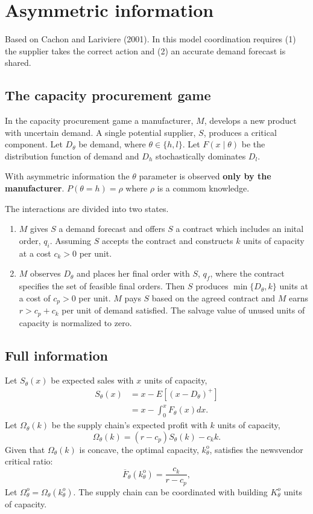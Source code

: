 \newpage
\section{Asymmetric information}
Based on Cachon and Lariviere (2001). In this model coordination requires (1) the supplier takes the correct action and (2) an accurate demand forecast is shared.

\subsection{The capacity procurement game}
In the capacity procurement game a manufacturer, $M$, develops a new product with uncertain demand. A single potential supplier, $S$, produces a critical component. Let $D_\theta$ be demand, where $\theta\in\{h,l\}$. Let $F(x\mid\theta)$ be the distribution function of demand and $D_h$ stochastically dominates $D_l$. 

With asymmetric information the $\theta$ parameter is observed \textbf{only by the manufacturer}. $P(\theta=h)=\rho$ where $\rho$ is a commom knowledge.

The interactions are divided into two states. 
\begin{enumerate}
    \item $M$ gives $S$ a demand forecast and offers $S$ a contract which includes an inital order, $q_i$. Assuming $S$ accepts the contract and constructs $k$ units of capacity at a cost $c_k>0$ per unit. 
    \item $M$ observes $D_\theta$ and places her final order with $S$, $q_f$, where the contract specifies the set of feasible final orders. Then $S$ produces $\min\{D_\theta,k\}$ units at a cost of $c_p>0$ per unit. $M$ pays $S$ based on the agreed contract and $M$ earns $r>c_p+c_k$ per unit of demand satisfied. The salvage value of unused units of capacity is normalized to zero. 
\end{enumerate}

\subsection{Full information}
Let $S_\theta(x)$ be expected sales with $x$ units of capacity,
\begin{align*}
    S_\theta(x)&=x-E\left[\left(x-D_\theta\right)^+\right]\\
    &=x-\int_0^x F_\theta(x)dx.
\end{align*}
Let $\Omega_\theta(k)$ be the supply chain's expected profit with $k$ units of capacity,
\begin{equation*}
    \Omega_\theta(k)=(r-c_p)S_\theta(k)-c_k k.
\end{equation*}
Given that $\Omega_{\theta}(k)$ is concave, the optimal capacity, $k_{\theta}^{\mathrm{o}}$, satisfies the newsvendor critical ratio:
$$
\overline{F}_{\theta}\left(k_{\theta}^{\mathrm{o}}\right)=\frac{c_{k}}{r-c_{p}},
$$
Let $\Omega_\theta^o=\Omega_\theta(k_\theta^o)$. The supply chain can be coordinated with building $K_\theta^o$ units of capacity.

